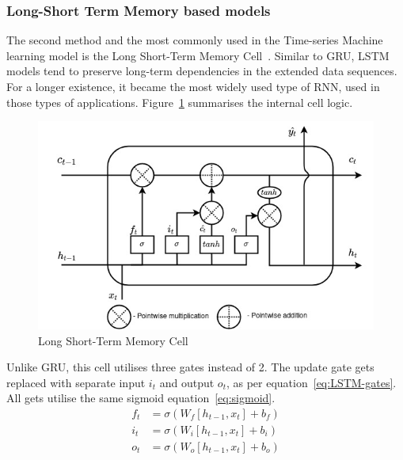 \subsubsection{Long-Short Term Memory based models} \label{subsub:lstm}
The second method and the most commonly used in the Time-series Machine learning model is the Long Short-Term Memory Cell~\cite{LSTM_Hochreiter1997}.
Similar to GRU, LSTM models tend to preserve long-term dependencies in the extended data sequences.
For a longer existence, it became the most widely used type of RNN, used in those types of applications.
Figure~\ref{fig:LSTM-cell} summarises the internal cell logic.
\begin{figure}[ht]%
    \centering
    \includegraphics[width=\linewidth]{II_Body/LSTM/images/LSTM.jpg}
    \caption{Long Short-Term Memory Cell}
    \label{fig:LSTM-cell}
\end{figure}
Unlike GRU, this cell utilises three gates instead of 2.
The update gate gets replaced with separate input $i_t$ and output $o_t$, as per equation~\ref{eq:LSTM-gates}.
All gets utilise the same sigmoid equation~\ref{eq:sigmoid}.
\begin{equation}
    \begin{split}
        f_t &= \sigma \left(W_f \left[h_{t-1}, x_t \right] + b_f \right) \\
        i_t &= \sigma \left(W_i \left[h_{t-1}, x_t \right] + b_i \right) \\
        o_t &= \sigma \left(W_o \left[h_{t-1}, x_t \right] + b_o \right) \\    
    \end{split}
    \label{eq:LSTM-gates}
\end{equation}
